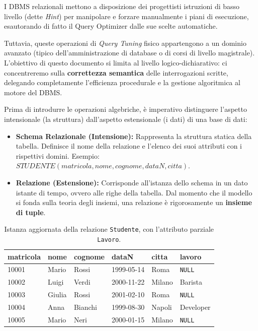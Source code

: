 \begin{dettagli}
I DBMS relazionali mettono a disposizione dei progettisti istruzioni di basso livello (dette \textit{Hint}) per manipolare e forzare manualmente i piani di esecuzione, esautorando di fatto il Query Optimizer dalle sue scelte automatiche. 

Tuttavia, queste operazioni di \textit{Query Tuning} fisico appartengono a un dominio avanzato (tipico dell'amministrazione di database o di corsi di livello magistrale). L'obiettivo di questo documento si limita al livello logico-dichiarativo: ci concentreremo sulla \textbf{correttezza semantica} delle interrogazioni scritte, delegando completamente l'efficienza procedurale e la gestione algoritmica al motore del DBMS.
\end{dettagli}

Prima di introdurre le operazioni algebriche, è imperativo distinguere l'aspetto intensionale (la struttura) dall'aspetto estensionale (i dati) di una base di dati:
\begin{itemize}
    \item \textbf{Schema Relazionale (Intensione):} Rappresenta la struttura statica della tabella. Definisce il nome della relazione e l'elenco dei suoi attributi con i rispettivi domini. Esempio: $STUDENTE(matricola, nome, cognome, dataN, citta)$.
    \item \textbf{Relazione (Estensione):} Corrisponde all'istanza dello schema in un dato istante di tempo, ovvero alle righe della tabella. Dal momento che il modello si fonda sulla teoria degli insiemi, una relazione è rigorosamente un \textbf{insieme di tuple}. 
\end{itemize}

\begin{table}[H]
    \centering
    \renewcommand{\arraystretch}{1.2}
    \begin{tabular}{llllll}
        \toprule
        \textbf{matricola} & \textbf{nome} & \textbf{cognome} & \textbf{dataN} & \textbf{citta} & \textbf{lavoro} \\
        \midrule
        10001 & Mario  & Rossi   & 1999-05-14 & Roma   & \texttt{NULL} \\
        10002 & Luigi  & Verdi   & 2000-11-22 & Milano & Barista \\
        10003 & Giulia & Rossi   & 2001-02-10 & Roma   & \texttt{NULL} \\
        10004 & Anna   & Bianchi & 1999-08-30 & Napoli & Developer \\
        10005 & Mario  & Neri    & 2000-01-15 & Milano & \texttt{NULL} \\
        \bottomrule
    \end{tabular}
    \caption{Istanza aggiornata della relazione \texttt{Studente}, con l'attributo parziale \texttt{Lavoro}.}
    \label{tab:studente_base_null}
\end{table}

